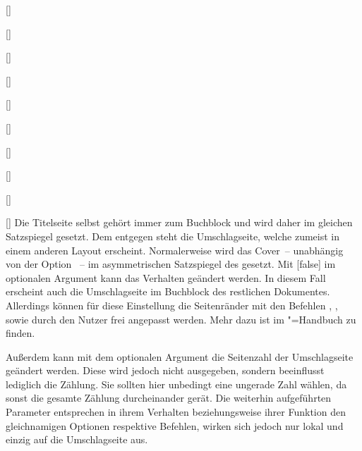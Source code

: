 \begin{Declaration}
\begin{Declaration}[v2.02]{%
  []%
}
\begin{Declaration}{[\PBoolean]}
\begin{Declaration}[v2.02]{[\PSet]}{%
}
\begin{Declaration}[v2.03]{[\PSet]}{%
}
\begin{Declaration}[v2.03]{[\PSet]}{%
}
\begin{Declaration}[v2.03]{%
  []%
}{}
\begin{Declaration}[v2.03]{%
  []
}{}
\begin{Declaration}[v2.03]{[\PSet]}{%
}
\begin{Declaration}[v2.03]{[\PSet]}{%
}
\begin{Declaration}[v2.03]{[\PSet]}{%
}
Die Titelseite selbst gehört immer zum Buchblock und wird daher im gleichen 
Satzspiegel gesetzt. Dem entgegen steht die Umschlagseite, welche zumeist in 
einem anderen Layout erscheint. Normalerweise wird das Cover~-- unabhängig von 
der Option ~-- im asymmetrischen Satzspiegel des \CDs 
gesetzt. Mit [false] im optionalen Argument 
kann das Verhalten geändert werden. In diesem Fall erscheint auch die 
Umschlagseite im Buchblock des restlichen Dokumentes. Allerdings können für 
diese Einstellung die Seitenränder mit den Befehlen , 
,  sowie 
 durch den Nutzer frei angepasst werden. Mehr dazu 
ist im \KOMAScript"=Handbuch \scrguide zu finden.

Außerdem kann mit dem optionalen Argument die Seitenzahl der Umschlagseite 
geändert werden. Diese wird jedoch nicht ausgegeben, sondern beeinflusst 
lediglich die Zählung. Sie sollten hier unbedingt eine ungerade Zahl wählen, da 
sonst die gesamte Zählung durcheinander gerät. Die weiterhin aufgeführten 
Parameter entsprechen in ihrem Verhalten beziehungsweise ihrer Funktion den 
gleichnamigen Optionen respektive Befehlen, wirken sich jedoch nur lokal und 
einzig auf die Umschlagseite aus.

\end{Declaration}
\end{Declaration}
\end{Declaration}
\end{Declaration}
\end{Declaration}
\end{Declaration}
\end{Declaration}
\end{Declaration}
\end{Declaration}
\end{Declaration}
\end{Declaration}

